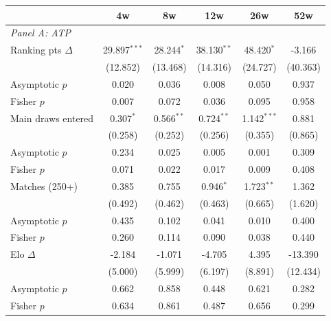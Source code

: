 \begin{tabular}{l ccccc}
\toprule
 & 4w & 8w & 12w & 26w & 52w \\
\midrule
\multicolumn{6}{l}{\textit{Panel A: ATP}} \\
\midrule
Ranking pts $\Delta$ & 29.897$^{***}$ & 28.244$^{*}$ & 38.130$^{**}$ & 48.420$^{*}$ & -3.166 \\
  & (12.852) & (13.468) & (14.316) & (24.727) & (40.363) \\
  Asymptotic $p$ & 0.020 & 0.036 & 0.008 & 0.050 & 0.937 \\
  Fisher $p$ & 0.007 & 0.072 & 0.036 & 0.095 & 0.958 \\[0.3em]
Main draws entered & 0.307$^{*}$ & 0.566$^{**}$ & 0.724$^{**}$ & 1.142$^{***}$ & 0.881 \\
  & (0.258) & (0.252) & (0.256) & (0.355) & (0.865) \\
  Asymptotic $p$ & 0.234 & 0.025 & 0.005 & 0.001 & 0.309 \\
  Fisher $p$ & 0.071 & 0.022 & 0.017 & 0.009 & 0.408 \\[0.3em]
Matches (250+) & 0.385 & 0.755 & 0.946$^{*}$ & 1.723$^{**}$ & 1.362 \\
  & (0.492) & (0.462) & (0.463) & (0.665) & (1.620) \\
  Asymptotic $p$ & 0.435 & 0.102 & 0.041 & 0.010 & 0.400 \\
  Fisher $p$ & 0.260 & 0.114 & 0.090 & 0.038 & 0.440 \\[0.3em]
Elo $\Delta$ & -2.184 & -1.071 & -4.705 & 4.395 & -13.390 \\
  & (5.000) & (5.999) & (6.197) & (8.891) & (12.434) \\
  Asymptotic $p$ & 0.662 & 0.858 & 0.448 & 0.621 & 0.282 \\
  Fisher $p$ & 0.634 & 0.861 & 0.487 & 0.656 & 0.299 \\[0.3em]


\end{tabular}
